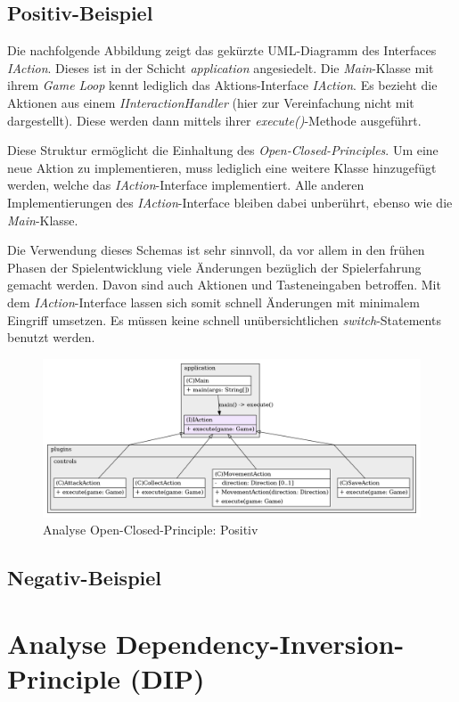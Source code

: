 \subsection{Positiv-Beispiel}
Die nachfolgende Abbildung zeigt das gekürzte UML-Diagramm des Interfaces
\textit{IAction}. Dieses ist in der Schicht \textit{application}
angesiedelt. Die \textit{Main}-Klasse mit ihrem \textit{Game Loop}
kennt lediglich das Aktions-Interface \textit{IAction}. Es bezieht
die Aktionen aus einem \textit{IInteractionHandler} (hier zur
Vereinfachung nicht mit dargestellt). Diese werden dann mittels
ihrer \textit{execute()}-Methode ausgeführt. 

Diese Struktur ermöglicht die Einhaltung des
\textit{Open-Closed-Principles}. Um eine neue Aktion zu implementieren,
muss lediglich eine weitere Klasse hinzugefügt werden, welche das 
\textit{IAction}-Interface implementiert. Alle anderen Implementierungen
des \textit{IAction}-Interface bleiben dabei unberührt, ebenso wie die
\textit{Main}-Klasse.

Die Verwendung dieses Schemas ist sehr sinnvoll, da vor allem in den
frühen Phasen der Spielentwicklung viele Änderungen bezüglich der
Spielerfahrung gemacht werden. Davon sind auch Aktionen und
Tasteneingaben betroffen. Mit dem \textit{IAction}-Interface lassen
sich somit schnell Änderungen mit minimalem Eingriff umsetzen. Es
müssen keine schnell unübersichtlichen \textit{switch}-Statements
benutzt werden. 

\vspace{0.2cm}
\begin{figure}[H]
    \centering
    \includegraphics[width=1\linewidth]{Bilder/Visualisierung/IAction_structure.png}
    \caption{Analyse Open-Closed-Principle: Positiv}
\end{figure}

\subsection{Negativ-Beispiel}

\section{Analyse Dependency-Inversion-Principle (DIP)}